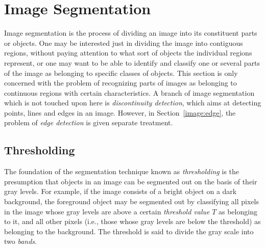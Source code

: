 
\section{Image Segmentation}
\label{image:segment}

Image segmentation is the process of dividing an image into its
constituent parts or objects.  One may be interested just in dividing
the image into contiguous regions, without paying attention to what
sort of objects the individual regions represent, or one may want to
be able to identify and classify one or several parts of the image as
belonging to specific classes of objects.  This section is only
concerned with the problem of recognizing parts of images as belonging
to continuous regions with certain characteristics.  A branch of image
segmentation which is not touched upon here is {\em discontinuity
  detection\/}, which aims at detecting points, lines and edges in an
image.  However, in Section~\ref{image:edge}, the problem of {\em edge
  detection\/} is given separate treatment.

\subsection{Thresholding}
\label{image:segment:threshold}

The foundation of the segmentation technique known as {\em
  thresholding\/} is the presumption that objects in an image can be 
segmented out on the basis of their gray levels.  For example, if the 
image consists of a bright object on a dark background, the foreground 
object may be segmented out by classifying all pixels in the image 
whose gray levels are above a certain {\em threshold value\/} $T$ as 
belonging to it, and all other pixels (i.e., those whose gray levels 
are below the threshold) as belonging to the background.  The 
threshold is said to divide the gray scale into two {\em bands\/}.


